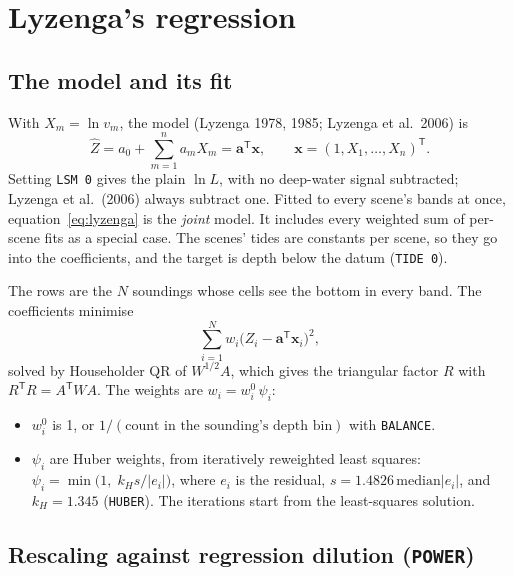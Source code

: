\documentclass[11pt]{article}
\numberwithin{equation}{section}
\newcommand{\code}[1]{\texttt{#1}}
\begin{document}
\section{Lyzenga's regression}
\label{sec:lyzenga}

\subsection{The model and its fit}

With $X_m = \ln v_m$, the model (Lyzenga 1978, 1985; Lyzenga et al.\ 2006) is
\begin{equation}
  \hat Z = a_0 + \sum_{m=1}^{n} a_m X_m = \mathbf{a}^{\mathsf T}\mathbf{x},
  \qquad \mathbf{x} = (1, X_1, \dots, X_n)^{\mathsf T}.
  \label{eq:lyzenga}
\end{equation}
Setting \code{LSM 0} gives the plain $\ln L$, with no deep-water signal subtracted; Lyzenga et
al.\ (2006) always subtract one. Fitted to every scene's bands at once,
equation~\eqref{eq:lyzenga} is the \emph{joint} model. It includes every weighted sum of per-scene
fits as a special case. The scenes' tides are constants per scene, so they go into the
coefficients, and the target is depth below the datum (\code{TIDE 0}).

The rows are the $N$ soundings whose cells see the bottom in every band. The coefficients
minimise
\begin{equation}
  \sum_{i=1}^{N} w_i \bigl(Z_i - \mathbf{a}^{\mathsf T}\mathbf{x}_i\bigr)^2 ,
\end{equation}
solved by Householder QR of $W^{1/2}A$, which gives the triangular factor $R$ with
$R^{\mathsf T}R = A^{\mathsf T}WA$. The weights are $w_i = w_i^{0}\,\psi_i$:
\begin{itemize}
\item $w_i^{0}$ is 1, or $1/(\text{count in the sounding's depth bin})$ with \code{BALANCE}.
\item $\psi_i$ are Huber weights, from iteratively reweighted least squares:
  $\psi_i = \min\bigl(1,\; k_H s / |e_i|\bigr)$, where $e_i$ is the residual,
  $s = 1.4826\,\mathrm{median}|e_i|$, and $k_H = 1.345$ (\code{HUBER}). The iterations start
  from the least-squares solution.
\end{itemize}

\subsection{Rescaling against regression dilution (\code{POWER})}
\end{document}
